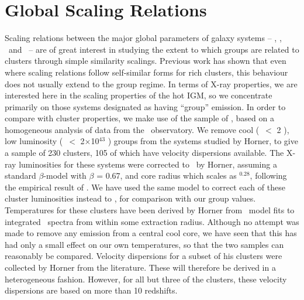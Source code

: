 \documentclass[usenatbib]{mn2e}
\begin{document}

\section{Global Scaling Relations}
\label{sec_scale}

Scaling relations between the major global parameters of galaxy systems -- \LX,
\TX, \sigmav\ and \LB\ -- are of great interest in studying the extent to which
groups are related to clusters through simple similarity scalings. Previous work
\citep{helsdon00a,helsdon00b,xue00,mulchaey00} has shown that even where scaling
relations follow self-similar forms for rich clusters, this behaviour does not
usually extend to the group regime. In terms of X-ray properties, we are
interested here in the scaling properties of the hot IGM, so we concentrate
primarily on those systems designated as having ``group'' emission. In order to
compare with cluster properties, we make use of the sample of \citet{horner01},
based on a homogeneous analysis of data from the \ASCA\ observatory.  We remove
cool (\TX\ $<$ 2 \kev), low luminosity (\LX\ $<$ 2$\times$10$^{43}$ \ergps)
groups from the systems studied by Horner, to give a sample of 230 clusters, 105
of which have velocity dispersions available.  The X-ray luminosities for these
systems were corrected to \rth\ by Horner, assuming a standard $\beta$-model with
$\beta$ = 0.67, and core radius which scales as \LX$^{0.28}$, following the
empirical result of \citet{bohringer00}.  We have used the same model to correct
each of these cluster luminosities instead to \rfh, for comparison with our group
values.  Temperatures for these clusters have been derived by Horner from \MEKAL\
model fits to integrated \ASCA\ spectra from within some extraction radius.
Although no attempt was made to remove any emission from a central cool core,
we have seen that this has had only a small effect on our own temperatures, so
that the two samples can reasonably be compared.  Velocity dispersions for a
subset of his clusters were collected by Horner from the literature. These will
therefore be derived in a heterogeneous fashion. However, for all but three of
the clusters, these velocity dispersions are based on more than 10 redshifts.

\end{document}
